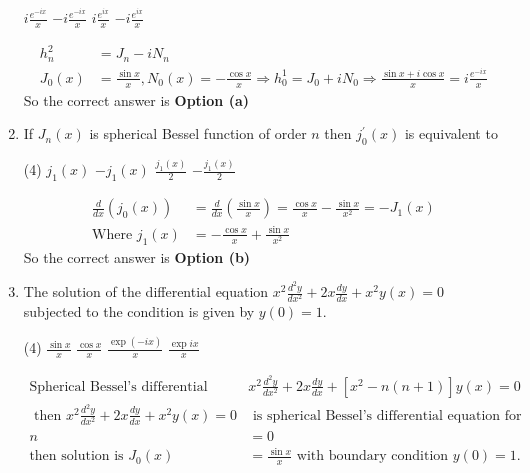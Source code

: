 \begin{enumerate}[label=\color{ocre}\textbf{\arabic*.}]
\begin{tasks}
	\task[\textbf{a.}] $i \frac{e^{-i x}}{x}$
	\task[\textbf{b.}] $-i \frac{e^{-i x}}{x}$
	\task[\textbf{c.}]$i \frac{e^{i x}}{x}$
	\task[\textbf{d.}] $-i \frac{e^{i x}}{x}$
\end{tasks}
\begin{answer}
	\begin{align*}
	h_{n}^{2}&=J_{n}-i N_{n}\\
	J_{0}(x)&=\frac{\sin x}{x},N_{0}(x)=-\frac{\cos x}{x} \Rightarrow h_{0}^{1}=J_{0}+i N_{0} \Rightarrow \frac{\sin x+i \cos x}{x}=i \frac{e^{-i x}}{x}
	\end{align*}
		So the correct answer is \textbf{Option (a)}
\end{answer}
\item If $J_{n}(x)$ is spherical Bessel function of order $n$ then $j_{0}^{\prime}(x)$ is equivalent to
 \begin{tasks}(4)
	\task[\textbf{a.}]$j_{1}(x)$
	\task[\textbf{b.}]$-j_{1}(x)$
	\task[\textbf{c.}]$\frac{j_{1}(x)}{2}$
	\task[\textbf{d.}]$-\frac{j_{1}(x)}{2}$
\end{tasks}
\begin{answer}
	\begin{align*}
	\frac{d}{d x}\left(j_{0}(x)\right)&=\frac{d}{d x}\left(\frac{\sin x}{x}\right)=\frac{\cos x}{x}-\frac{\sin x}{x^{2}}=-J_{1}(x)\\
	\text{Where }j_{1}(x)&=-\frac{\cos x}{x}+\frac{\sin x}{x^{2}}
	\end{align*}
	So the correct answer is \textbf{Option (b)}
\end{answer}
\item The solution of the differential equation $x^{2} \frac{d^{2} y}{d x^{2}}+2 x \frac{d y}{d x}+x^{2} y(x)=0$ subjected to the condition is given by $y(0)=1$.
 \begin{tasks}(4)
	\task[\textbf{a.}] $\frac{\sin x}{x}$
	\task[\textbf{b.}] $\frac{\cos x}{x}$
	\task[\textbf{c.}]$\frac{\exp (-i x)}{x}$
	\task[\textbf{d.}] $\frac{\exp i x}{x}$
\end{tasks}
\begin{answer}
	\begin{align*}
 \text{Spherical Bessel's differential equation }&x^{2} \frac{d^{2} y}{d x^{2}}+2 x \frac{d y}{d x}+\left[x^{2}-n(n+1)\right] y(x)=0\\
 \text{ then }x^{2} \frac{d^{2} y}{d x^{2}}+2 x \frac{d y}{d x}+x^{2} y(x)=0 &\text{ is spherical Bessel's differential equation for order}\\
 n&=0\\
	\text{then solution is }J_{0}(x)&=\frac{\sin x}{x}\text{ with boundary condition }y(0)=1.

\end{align*}
\end{answer}
\end{enumerate}
